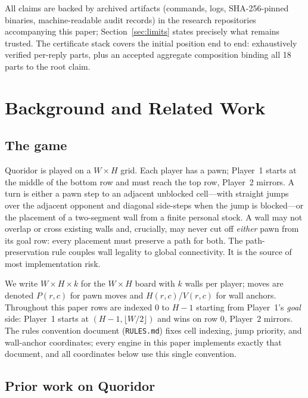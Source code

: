 \documentclass[conference]{IEEEtran}
\newcommand{\varSpec}[3]{$#1{\times}#2{\times}#3$}
\begin{document}
All claims are backed by archived artifacts (commands, logs, SHA-256-pinned binaries, machine-readable audit records) in the research repositories accompanying this paper; Section~\ref{sec:limits} states precisely what remains trusted. The certificate stack covers the initial position end to end: exhaustively verified per-reply parts, plus an accepted aggregate composition binding all 18 parts to the root claim.

\section{Background and Related Work}
\label{sec:related}

\subsection{The game}

Quoridor is played on a $W\times H$ grid. Each player has a pawn; Player~1 starts at the middle of the bottom row and must reach the top row, Player~2 mirrors. A turn is either a pawn step to an adjacent unblocked cell---with straight jumps over the adjacent opponent and diagonal side-steps when the jump is blocked---or the placement of a two-segment wall from a finite personal stock. A wall may not overlap or cross existing walls and, crucially, may never cut off \emph{either} pawn from its goal row: every placement must preserve a path for both. The path-preservation rule couples wall legality to global connectivity. It is the source of most implementation risk.

We write \varSpec{W}{H}{k} for the $W\times H$ board with $k$ walls per player; moves are denoted $P(r,c)$ for pawn moves and $H(r,c)$/$V(r,c)$ for wall anchors. Throughout this paper rows are indexed $0$ to $H{-}1$ starting from Player~1's \emph{goal} side: Player~1 starts at $(H{-}1,\lfloor W/2\rfloor)$ and wins on row $0$, Player~2 mirrors. The rules convention document (\texttt{RULES.md}) fixes cell indexing, jump priority, and wall-anchor coordinates; every engine in this paper implements exactly that document, and all coordinates below use this single convention.

\subsection{Prior work on Quoridor}
\end{document}
